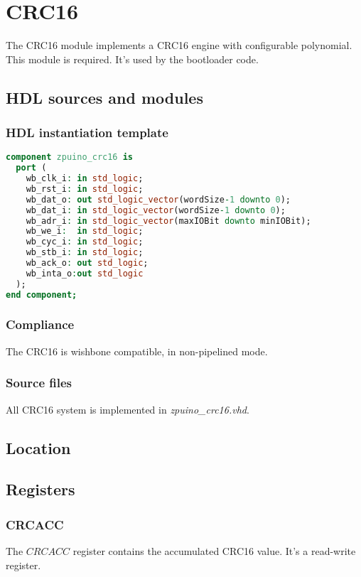 \section{CRC16}
The CRC16 module implements a CRC16 engine with configurable polynomial.\\
This module is required. It's used by the bootloader code.
\subsection{HDL sources and modules}
\subsubsection{HDL instantiation template}



\begin{lstlisting}[language=VHDL]
component zpuino_crc16 is
  port (
    wb_clk_i: in std_logic;
    wb_rst_i: in std_logic;
    wb_dat_o: out std_logic_vector(wordSize-1 downto 0);
    wb_dat_i: in std_logic_vector(wordSize-1 downto 0);
    wb_adr_i: in std_logic_vector(maxIOBit downto minIOBit);
    wb_we_i:  in std_logic;
    wb_cyc_i: in std_logic;
    wb_stb_i: in std_logic;
    wb_ack_o: out std_logic;
    wb_inta_o:out std_logic
  );
end component;
\end{lstlisting}



\subsubsection{Compliance}
The CRC16 is wishbone compatible, in non-pipelined mode.


\subsubsection{Source files}
All CRC16 system is implemented in \emph{zpuino\_crc16.vhd}.

\subsection{Location}

\subsection{Registers}

\subsubsection{CRCACC}
The $CRCACC$ register contains the accumulated CRC16 value. It's a read-write register.

